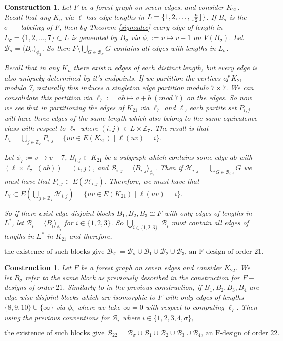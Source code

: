 \documentclass[addpoints,11pt]{exam}
\newtheorem{const}[theorem]{Construction}
\theoremstyle{definition}
\DeclarePairedDelimiter\floor{\lfloor}{\rfloor}
\newcommand{\BB}{\ensuremath{\mathcal{B}}}
\newcommand{\ZZ}{\ensuremath{\mathbb{Z}}}
\begin{document}
\begin{const}\label{8910Bmod21}
Let $F$ be a forest graph on seven edges, and consider $K_{21}$. Recall that any $K_{n}$ via $\ell$ has edge lengths in $L = \{1,2,\hdots, \floor{\frac{n}{2}}\}$. If $B_{\sigma}$ is the $\sigma^{+-}$ labeling of $F$, then by Theorem \ref{sigmadec} every edge of length in $L_{\sigma}=\{1,2,\hdots, 7\}\subset L$ is generated by $B_{\sigma}$ via $\phi_{1}:=v\mapsto v+1$ on $V(B_{\sigma})$. Let $\BB_{\sigma}=\langle B_{\sigma}\rangle_{\phi_{1}}$. So then $F\setminus \bigcup\limits_{G\in \BB_{\sigma}} G$ contains all edges with lengths in $L_{\sigma}$.

Recall that in any $K_{n}$ there exist $n$ edges of each distinct length, but every edge is also uniquely determined by it's endpoints. If we partition the vertices of $K_{21}$ modulo 7, naturally this induces a singleton edge partition modulo $7\times 7$. We can consolidate this partition via $\ell_{7}:=\;ab\mapsto a+b\;(mod\;7)$ on the edges. So now we see that in partitioning the edges of $K_{21}$ via $\ell_{7}$ and $\ell$, each partite set $P_{i,j}$ will have three edges of the same length which also belong to the same equivalence class with respect to $\ell_{7}$ where $(i,j)\in L\times \ZZ_{7}$. The result is that $L_{i}=\bigcup\limits_{j\in \ZZ_{7}}P_{i,j}=\{uv\in E(K_{21}) \mid \ell(uv)=i \}$.

Let $\phi_{7}:=v\mapsto v+7$, $B_{i,j} \subset K_{21}$ be a subgraph which contains some edge $ab$ with $(\ell\times\ell_{7}\;(ab))=(i,j)$, and $\BB_{i,j}=\langle B_{i,j}\rangle_{\phi_{7}}$. Then if $\mathcal{H}_{i,j}=\bigcup\limits_{G\in \BB_{i,j}} G$ we must have that $P_{i,j}\subset E(\mathcal{H}_{i,j})$. Therefore, we must have that $L_{i}\subset E(\bigcup\limits_{j\in \ZZ_{7}}\mathcal{H}_{i,j})=\{uv\in E(K_{21})\mid \ell(uv)=i\}$.

So if there exist edge-disjoint blocks $B_{1},B_{2},B_{3} \cong F$ with only edges of lengths in $L^{*}$, let $\BB_{i}=\langle B_{i}\rangle_{\phi_{7}}$ for $i\in \{1,2,3\}$. So $\bigcup\limits_{i\in\{1,2,3\}}\;\BB_{i}$ must contain all edges of lengths in $L^{*}$ in $K_{21}$ and therefore,

$$\text{the existence of such blocks give }\BB_{21}=\BB_{\sigma}\cup\BB_{1}\cup\BB_{2}\cup\BB_{3} \text{, an F-design of order 21}.$$

\end{const}

\begin{const}\label{8910Bmod22}
Let $F$ be a forest graph on seven edges and consider $K_{22}$. We let $B_{\sigma}$ refer to the same block as previously described in the construction for $F-$designs of order $21$. Similarly to in the previous construction, if $B_{1},B_{2},B_{3},B_{4}$ are edge-wise disjoint blocks which are isomorphic to $F$ with only edges of lengths $\{8,9,10\}\cup \{\infty\}$ via $\phi_{7}$ where we take $\infty = 0$ with respect to computing $\ell_{7}$. Then using the previous conventions for $\BB_{i}$ where $i\in \{1,2,3,4,\sigma\}$,

$$\text{the existence of such blocks give }\BB_{22}=\BB_{\sigma}\cup\BB_{1}\cup\BB_{2}\cup\BB_{3}\cup\BB_{4} \text{, an F-design of order 22}.$$
\end{const}
\newpage
\end{document}
